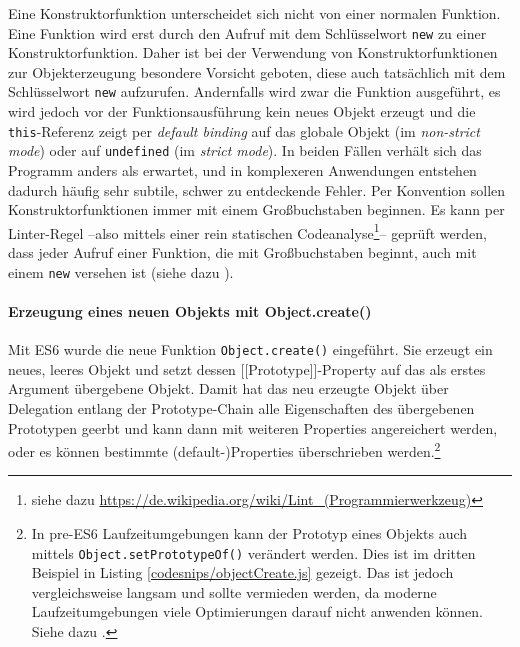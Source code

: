 Eine Konstruktorfunktion unterscheidet sich nicht von einer normalen Funktion. Eine Funktion wird erst durch den Aufruf mit dem Schlüsselwort \texttt{new} zu einer Konstruktorfunktion. Daher ist bei der Verwendung von Konstruktorfunktionen zur Objekterzeugung besondere Vorsicht geboten, diese auch tatsächlich mit dem Schlüsselwort \texttt{new} aufzurufen. Andernfalls wird zwar die Funktion ausgeführt, es wird jedoch vor der Funktionsausführung kein neues Objekt erzeugt und die \texttt{this}-Referenz zeigt per \emph{default binding} auf das globale Objekt (im \emph{non-strict mode}) oder auf \texttt{undefined} (im \emph{strict mode}). In beiden Fällen verhält sich das Programm anders als erwartet, und in komplexeren Anwendungen entstehen dadurch häufig sehr subtile, schwer zu entdeckende Fehler. Per Konvention sollen Konstruktorfunktionen immer mit einem Großbuchstaben beginnen. Es kann per Linter-Regel --also mittels einer rein statischen Codeanalyse\footnote{siehe dazu \url{https://de.wikipedia.org/wiki/Lint_(Programmierwerkzeug)}}-- geprüft werden, dass jeder Aufruf einer Funktion, die mit Großbuchstaben beginnt, auch mit einem \texttt{new} versehen ist (siehe dazu \citep[p. 96]{SimpsonThisobjectprototypes2014}).




\paragraph{Erzeugung eines neuen Objekts mit Object.create()} Mit ES6 wurde die neue Funktion \texttt{Object.create()} eingeführt. Sie erzeugt ein neues, leeres Objekt und setzt dessen [[Prototype]]-Property auf das als erstes Argument übergebene Objekt. Damit hat das neu erzeugte Objekt über Delegation entlang der Prototype-Chain alle Eigenschaften des übergebenen Prototypen geerbt und kann dann mit weiteren Properties angereichert werden, oder es können bestimmte (default-)Properties überschrieben werden.\footnote{
In pre-ES6 Laufzeitumgebungen kann der Prototyp eines Objekts auch mittels \texttt{Object.setPrototypeOf()} verändert werden. Dies ist im dritten Beispiel in Listing \ref{codesnips/objectCreate.js} gezeigt. Das ist jedoch vergleichsweise langsam und sollte vermieden werden, da moderne Laufzeitumgebungen viele Optimierungen darauf nicht anwenden können. Siehe dazu  \citep{MozillaDeveloperNetworkObjectsetPrototypeOf}.
}

